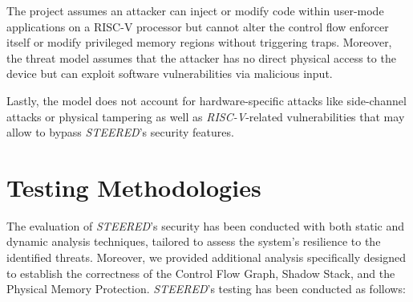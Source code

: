 The project assumes an attacker can inject or modify code within user-mode
applications on a RISC-V processor but cannot alter the control flow enforcer
itself or modify privileged memory regions without triggering traps. Moreover,
the threat model assumes that the attacker has no direct physical access to the
device but can exploit software vulnerabilities via malicious input.

Lastly, the model does not account for hardware-specific attacks like side-channel
attacks or physical tampering as well as \textit{RISC-V}-related vulnerabilities
that may allow to bypass \textit{STEERED}'s security features.

\section{Testing Methodologies}
\label{sec:ta_methodologies}

The evaluation of \textit{STEERED}'s security has been conducted with both static
and dynamic analysis techniques, tailored to assess the system's resilience to
the identified threats. Moreover, we provided additional analysis specifically
designed to establish the correctness of the Control Flow Graph, Shadow Stack,
and the Physical Memory Protection. \textit{STEERED}'s testing has been
conducted as follows:

